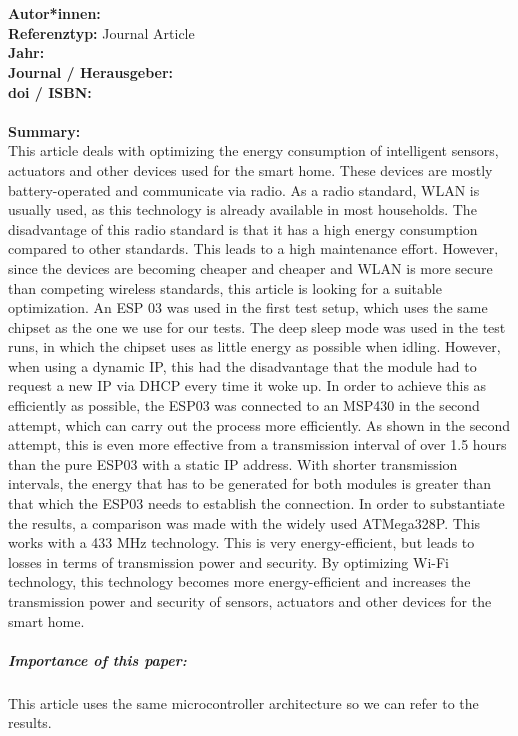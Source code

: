 \documentclass{report}
\newcommand{\createJournalArticleHeader}[1]{
    {\let\clearpage\relax \chapter{\citetitle{#1}}}
    \noindent
    \textbf{Autor*innen:} \citeauthor{#1} \\
    \textbf{Referenztyp:} Journal Article\\
    \textbf{Jahr:} \citeyear{#1} \\
    \textbf{Journal / Herausgeber:} \citefield{#1}{journaltitle}\\
    \textbf{doi / ISBN:} \citefield{#1}{doi} \\\\
    \textbf{Summary:}\\
}
\begin{document}

\createJournalArticleHeader{thomas_optimizing_2016}
This article deals with optimizing the energy consumption of intelligent sensors, actuators and other devices used for the smart home. These devices are mostly battery-operated and communicate via radio.
As a radio standard, WLAN is usually used, as this technology is already available in most households. The disadvantage of this radio standard is that it has a high energy consumption compared to other standards. This leads to a high maintenance effort. However, since the devices are becoming cheaper and cheaper and WLAN is more secure than competing wireless standards, this article is looking for a suitable optimization.
An ESP 03 was used in the first test setup, which uses the same chipset as the one we use for our tests.
The deep sleep mode was used in the test runs, in which the chipset uses as little energy as possible when idling. However, when using a dynamic IP, this had the disadvantage that the module had to request a new IP via DHCP every time it woke up. In order to achieve this as efficiently as possible, the ESP03 was connected to an MSP430 in the second attempt, which can carry out the process more efficiently. As shown in the second attempt, this is even more effective from a transmission interval of over 1.5 hours than the pure ESP03 with a static IP address. With shorter transmission intervals, the energy that has to be generated for both modules is greater than that which the ESP03 needs to establish the connection. In order to substantiate the results, a comparison was made with the widely used ATMega328P. This works with a 433 MHz technology. This is very energy-efficient, but leads to losses in terms of transmission power and security. By optimizing Wi-Fi technology, this technology becomes more energy-efficient and increases the transmission power and security of sensors, actuators and other devices for the smart home.
\\
\paragraph{Importance of this paper:}
This article uses the same microcontroller architecture so we can refer to the results.
	
\end{document}
